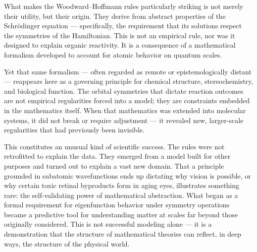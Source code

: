 \begin{commentary}
What makes the Woodward–Hoffmann rules particularly striking is not merely their utility, but their origin. They derive from abstract properties of the Schrödinger equation — specifically, the requirement that its solutions respect the symmetries of the Hamiltonian. This is not an empirical rule, nor was it designed to explain organic reactivity. It is a consequence of a mathematical formalism developed to account for atomic behavior on quantum scales.

Yet that same formalism — often regarded as remote or epistemologically distant — reappears here as a governing principle for chemical structure, stereochemistry, and biological function. The orbital symmetries that dictate reaction outcomes are not empirical regularities forced into a model; they are constraints embedded in the mathematics itself. When that mathematics was extended into molecular systems, it did not break or require adjustment — it revealed new, larger-scale regularities that had previously been invisible.

This constitutes an unusual kind of scientific success. The rules were not retrofitted to explain the data. They emerged from a model built for other purposes and turned out to explain a vast new domain. That a principle grounded in subatomic wavefunctions ends up dictating why vision is possible, or why certain toxic retinal byproducts form in aging eyes, illustrates something rare: the self-validating power of mathematical abstraction. What began as a formal requirement for eigenfunction behavior under symmetry operations became a predictive tool for understanding matter at scales far beyond those originally considered. This is not successful modeling alone — it is a demonstration that the structure of mathematical theories can reflect, in deep ways, the structure of the physical world.
\end{commentary}
